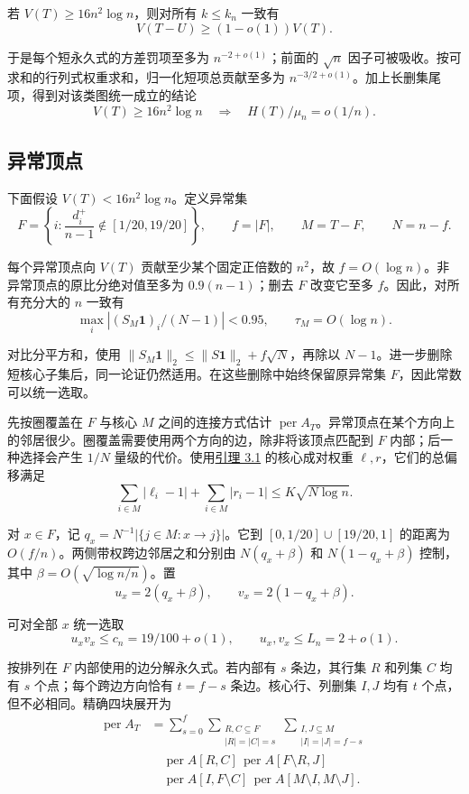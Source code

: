 \documentclass[11pt,a4paper]{article}
\newcommand{\paperref}[2]{\hyperref[#1]{#2}}
\begin{document}
若 \(V(T)\ge16n^2\log n\)，则对所有 \(k\le k_n\) 一致有
\[V(T-U)\ge(1-o(1))V(T).\]

于是每个短永久式的方差罚项至多为 \(n^{-2+o(1)}\)；前面的 \(\sqrt n\) 因子可被吸收。按可求和的行列式权重求和，归一化短项总贡献至多为 \(n^{-3/2+o(1)}\)。加上长删集尾项，得到对该类图统一成立的结论
\[V(T)\ge16n^2\log n\quad\Longrightarrow\quad
H(T)/\mu_n=o(1/n).\]

\subsection{异常顶点}\label{sec-3.3}

下面假设 \(V(T)<16n^2\log n\)。定义异常集
\[F=\left\{i:\frac{d_i^+}{n-1}\notin[1/20,19/20]\right\},
\qquad f=|F|,\qquad M=T-F,\qquad N=n-f.\]

每个异常顶点向 \(V(T)\) 贡献至少某个固定正倍数的 \(n^2\)，故 \(f=O(\log n)\)。非异常顶点的原比分绝对值至多为 \(0.9(n-1)\)；删去 \(F\) 改变它至多 \(f\)。因此，对所有充分大的 \(n\) 一致有
\[\max_i|(S_M\mathbf1)_i/(N-1)|<0.95,\qquad
\tau_M=O(\log n).\]

对比分平方和，使用 \(\|S_M\mathbf1\|_2\le\|S\mathbf1\|_2+f\sqrt N\)，再除以 \(N-1\)。进一步删除短核心子集后，同一论证仍然适用。在这些删除中始终保留原异常集 \(F\)，因此常数可以统一选取。

先按圈覆盖在 \(F\) 与核心 \(M\) 之间的连接方式估计 \(\operatorname{per}A_T\)。异常顶点在某个方向上的邻居很少。圈覆盖需要使用两个方向的边，除非将该顶点匹配到 \(F\) 内部；后一种选择会产生 \(1/N\) 量级的代价。使用\paperref{thm-3.1}{引理 3.1} 的核心成对权重 \(\ell,r\)，它们的总偏移满足
\[\sum_{i\in M}|\ell_i-1|+\sum_{i\in M}|r_i-1|
\le K\sqrt{N\log n}.\]

对 \(x\in F\)，记 \(q_x=N^{-1}|\{j\in M:x\to j\}|\)。它到 \([0,1/20]\cup[19/20,1]\) 的距离为 \(O(f/n)\)。两侧带权跨边邻居之和分别由 \(N(q_x+\beta)\) 和 \(N(1-q_x+\beta)\) 控制，其中 \(\beta=O(\sqrt{\log n/n})\)。置
\[u_x=2(q_x+\beta),\qquad v_x=2(1-q_x+\beta).\]

可对全部 \(x\) 统一选取
\[u_xv_x\le c_n=19/100+o(1),\qquad
u_x,v_x\le L_n=2+o(1).\]

按排列在 \(F\) 内部使用的边分解永久式。若内部有 \(s\) 条边，其行集 \(R\) 和列集 \(C\) 均有 \(s\) 个点；每个跨边方向恰有 \(t=f-s\) 条边。核心行、列删集 \(I,J\) 均有 \(t\) 个点，但不必相同。精确四块展开为
\[\begin{aligned}
\operatorname{per}A_T
&=\sum_{s=0}^{f}
\sum_{\substack{R,C\subseteq F\\|R|=|C|=s}}
\sum_{\substack{I,J\subseteq M\\|I|=|J|=f-s}}
\\&\quad\operatorname{per}A[R,C]\,
\operatorname{per}A[F\setminus R,J]\,
\\&\quad\operatorname{per}A[I,F\setminus C]\,
\operatorname{per}A[M\setminus I,M\setminus J].
\end{aligned}\]
\end{document}
